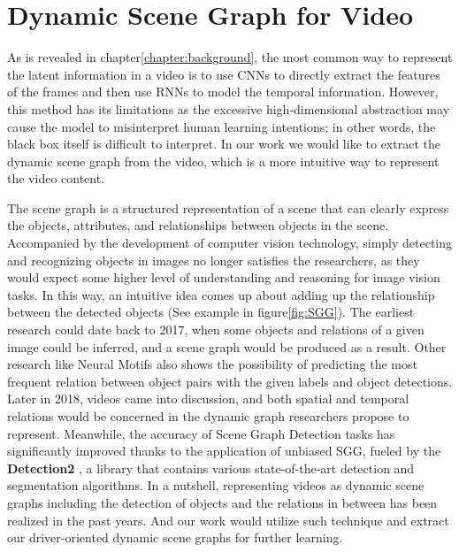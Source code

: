 \section{Dynamic Scene Graph for Video}

As is revealed in chapter\ref{chapter:background}, the most common way to represent the latent information in a video is to use CNNs to directly extract the features of the frames and then use RNNs to model the temporal information. However, this method has its limitations as the excessive high-dimensional abstraction may cause the model to misinterpret human learning intentions; in other words, the black box itself is difficult to interpret. In our work we would like to extract the dynamic scene graph from the video, which is a more intuitive way to represent the video content.

The scene graph is a structured representation of a scene that can clearly express the objects, attributes, and relationships between objects in the scene\cite{9661322}. Accompanied by the development of computer vision technology, simply detecting and recognizing objects in images no longer satisfies the researchers, as they would expect some higher level of understanding and reasoning for image vision tasks. In this way, an intuitive idea comes up about adding up the relationship between the detected objects (See example in figure\ref{fig:SGG}). The earliest research could date back to 2017, when some objects and relations of a given image could be inferred, and a scene graph would be produced as a result\cite{xu2017scene}. Other research like Neural Motifs\cite{zellers2018neural} also shows the possibility of predicting the most frequent relation between object pairs with the given labels and object detections. Later in 2018, videos came into discussion, and both spatial and temporal relations would be concerned in the dynamic graph researchers propose to represent\cite{wang2018videos}. Meanwhile, the accuracy of Scene Graph Detection tasks has significantly improved thanks to the application of unbiased SGG\cite{wang2018videos}, fueled by the \textbf{Detection2} \cite{wu2019detectron2}, a library that contains various state-of-the-art detection and segmentation algorithms. In a nutshell, representing videos as dynamic scene graphs including the detection of objects and the relations in between has been realized in the past years. And our work would utilize such technique and extract our driver-oriented dynamic scene graphs for further learning.

